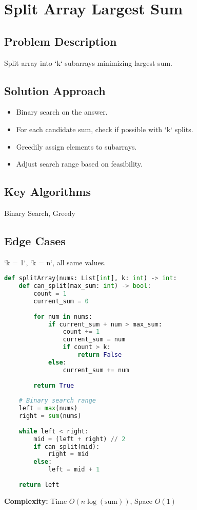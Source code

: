\documentclass[10pt, a4paper]{article}
\begin{document}
\section{Split Array Largest Sum}
\subsection*{Problem Description}
Split array into `k` subarrays minimizing largest sum.

\subsection*{Solution Approach}
\begin{itemize}
    \item Binary search on the answer.
    \item For each candidate sum, check if possible with `k` splits.
    \item Greedily assign elements to subarrays.
    \item Adjust search range based on feasibility.
\end{itemize}

\subsection*{Key Algorithms}
Binary Search, Greedy

\subsection*{Edge Cases}
`k = 1`, `k = n`, all same values.

\begin{lstlisting}[language=Python]
def splitArray(nums: List[int], k: int) -> int:
    def can_split(max_sum: int) -> bool:
        count = 1
        current_sum = 0
        
        for num in nums:
            if current_sum + num > max_sum:
                count += 1
                current_sum = num
                if count > k:
                    return False
            else:
                current_sum += num
        
        return True
    
    # Binary search range
    left = max(nums)
    right = sum(nums)
    
    while left < right:
        mid = (left + right) // 2
        if can_split(mid):
            right = mid
        else:
            left = mid + 1
    
    return left
\end{lstlisting}
\textbf{Complexity:} Time $O(n \log(\text{sum}))$, Space $O(1)$
\end{document}
